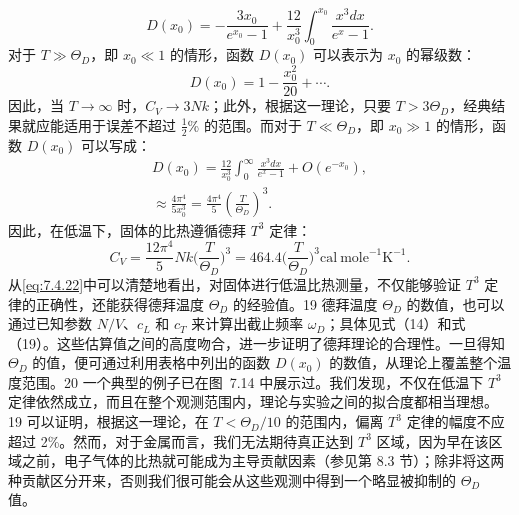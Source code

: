 \begin{equation}\tag{7.4.19}\label{eq:7.4.19}
D ( x _ { 0 } ) = - \frac { 3 x _ { 0 } } { e ^{x _ { 0} } - 1 } + \frac { 12 } { x _ { 0 } ^{3} } \int _ { 0 } ^{x _ { 0} } \frac { x ^{3} d x } { e ^{x} - 1 } .
\end{equation}
对于 \(T \gg \Theta_{D}\)，即 \(x_{0} \ll 1\) 的情形，函数 \(D(x_{0})\) 可以表示为 \(x_{0}\) 的幂级数：
\begin{equation}\tag{7.4.20}\label{eq:7.4.20}
D ( x _ { 0 } ) = 1 - { \frac { x _ { 0 } ^{2} } { 20 } } + \cdots .
\end{equation}
因此，当 \(T \to \infty\) 时，\(C_V \to 3Nk\)；此外，根据这一理论，只要 \(T > 3\Theta_D\)，经典结果就应能适用于误差不超过 \(\frac{1}{2}\)\% 的范围。而对于 \(T \ll \Theta_D\)，即 \(x_0 \gg 1\) 的情形，函数 \(D(x_0)\) 可以写成：
\begin{equation}\tag{7.4.21}\label{eq:7.4.21}
\begin{array}{r} { D ( x _ { 0 } ) = \frac { 12 } { x _ { 0 } ^{3} } \int _ { 0 } ^{\infty} \frac { x ^{3} d x } { e ^{x} - 1 } + O ( e ^{- x _ { 0} } ) , } \\{ \approx \frac { 4 \pi ^{4} } { 5 x _ { 0 } ^{3} } = \frac { 4 \pi ^{4} } { 5 } \left( \frac { T } { \Theta _ { D } } \right) ^{3} . } \end{array}
\end{equation}
因此，在低温下，固体的比热遵循德拜 \(T^{3}\) 定律：
\begin{equation}\tag{7.4.22}\label{eq:7.4.22}
C _ { V } = \frac { 12 \pi ^{4} } { 5 } N k \biggl ( \frac { T } { \Theta _ { D } } \biggr ) ^{3} = 46 4 . 4 \biggl ( \frac { T } { \Theta _ { D } } \biggr ) ^{3} \mathrm { c a l \ m o l e } ^{- 1} \mathrm { K } ^{- 1} .
\end{equation}
从\autoref{eq:7.4.22}中可以清楚地看出，对固体进行低温比热测量，不仅能够验证 \(T^{3}\) 定律的正确性，还能获得德拜温度 \(\Theta_{D}\) 的经验值。19 德拜温度 \(\Theta_{D}\) 的数值，也可以通过已知参数 \(N/V\)、\(c_{L}\) 和 \(c_{T}\) 来计算出截止频率 \(\omega_{D}\)；具体见式（14）和式（19）。这些估算值之间的高度吻合，进一步证明了德拜理论的合理性。一旦得知 \(\Theta_{D}\) 的值，便可通过利用表格中列出的函数 \(D(x_{0})\) 的数值，从理论上覆盖整个温度范围。20 一个典型的例子已在图~7.14 中展示过。我们发现，不仅在低温下 \(T^{3}\) 定律依然成立，而且在整个观测范围内，理论与实验之间的拟合度都相当理想。
19 可以证明，根据这一理论，在 \(T < \Theta_{D}/10\) 的范围内，偏离 \(T^{3}\) 定律的幅度不应超过 2\%。然而，对于金属而言，我们无法期待真正达到 \(T^{3}\) 区域，因为早在该区域之前，电子气体的比热就可能成为主导贡献因素（参见第 8.3 节）；除非将这两种贡献区分开来，否则我们很可能会从这些观测中得到一个略显被抑制的 \(\Theta_{D}\) 值。
